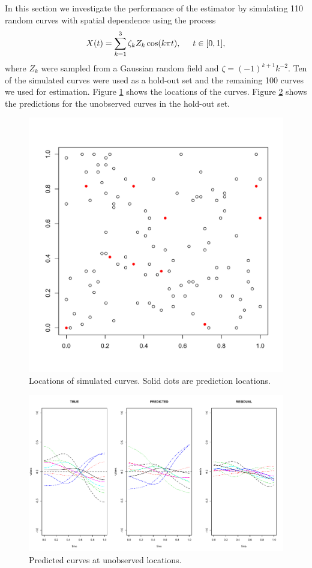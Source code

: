 \label{sec:numerical_experiments}

In this section we investigate the performance of the estimator by simulating 110 random curves with spatial dependence using the process 
\begin{equation}
	X(t) = \sum^{3}_{k=1}\zeta_k Z_k \cos(k\pi t), \hspace{0.5cm} t \in [0,1], \label{eq:sim process2} 
\end{equation}
where $Z_k$ were sampled from a Gaussian random field and \(\zeta=(-1)^{k+1}k^{-2}\). Ten of the simulated curves were used as a hold-out set and the remaining 100 curves we used for estimation. Figure \ref{fig:locations} shows the locations of the curves. Figure \ref{fig:curve kriging predictions} shows the predictions for the unobserved curves in the hold-out set. 
\begin{figure}
	\begin{center}
		\includegraphics[width=0.5
		\textwidth]{images/kriging/locations.pdf} 
	\end{center}
	\caption{Locations of simulated curves. Solid dots are prediction locations.} \label{fig:locations} 
\end{figure}
\begin{figure}
	\begin{center}
		\includegraphics[width=0.6
		\textwidth]{images/kriging/residual-curves.pdf} 
	\end{center}
	\caption{Predicted curves at unobserved locations. } \label{fig:curve kriging predictions} 
\end{figure}

